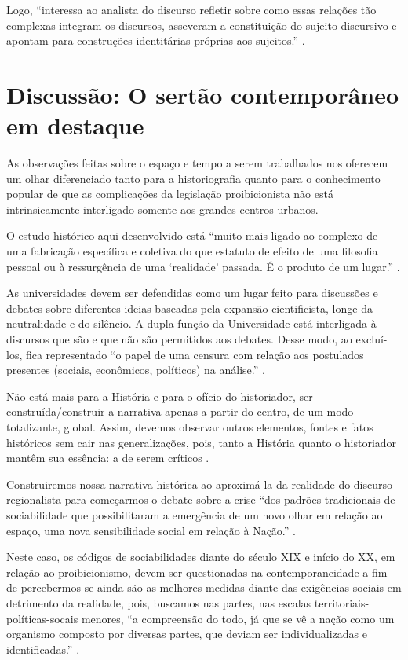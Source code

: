 \begin{refsection}
    Logo, ``interessa ao analista do discurso refletir sobre como essas relações tão complexas integram os discursos, asseveram a constituição do sujeito discursivo e apontam para construções identitárias próprias aos sujeitos.'' \cite[p.~59]{Fernandes2012Discurso}.

    \section{Discussão: O sertão contemporâneo em destaque}

    As observações feitas sobre o espaço e tempo a serem trabalhados nos oferecem um olhar diferenciado tanto para a historiografia quanto para o conhecimento popular de que as complicações da legislação proibicionista não está intrinsicamente interligado somente aos grandes centros urbanos. 

    O estudo histórico aqui desenvolvido está ``muito mais ligado ao complexo de uma fabricação específica e coletiva do que estatuto de efeito de uma filosofia pessoal ou à ressurgência de uma `realidade' passada. É o produto de um lugar.'' \cite[p.~57]{Certeau1982Escrita}.

    As universidades devem ser defendidas como um lugar feito para discussões e debates sobre diferentes ideias baseadas pela expansão cientificista, longe da neutralidade e do silêncio. A dupla função da Universidade está interligada à discursos que são e que não são permitidos aos debates. Desse modo, ao excluí-los, fica representado ``o papel de uma censura com relação aos postulados presentes (sociais, econômicos, políticos) na análise.'' \cite[p.~63]{Certeau1982Escrita}.

    Não está mais para a História e para o ofício do historiador, ser construída/construir a narrativa apenas a partir do centro, de um modo totalizante, global. Assim, devemos observar outros elementos, fontes e fatos históricos sem cair nas generalizações, pois, tanto a História quanto o historiador mantêm sua essência: a de serem críticos \cite{Certeau1982Escrita}.

    Construiremos nossa narrativa histórica ao aproximá-la da realidade do discurso regionalista para começarmos o debate sobre a crise ``dos padrões tradicionais de sociabilidade que possibilitaram a emergência de um novo olhar em relação ao espaço, uma nova sensibilidade social em relação à Nação.'' \cite[p.~52]{AlbuquerqueJr2009Invencao}.

    Neste caso, os códigos de sociabilidades diante do século XIX e início do XX, em relação ao proibicionismo, devem ser questionadas na contemporaneidade a fim de percebermos se ainda são as melhores medidas diante das exigências sociais em detrimento da realidade, pois, buscamos nas partes, nas escalas territoriais-políticas-socais menores, ``a compreensão do todo, já que se vê a nação como um organismo composto por diversas partes, que deviam ser individualizadas e identificadas.'' \cite[p.~53]{AlbuquerqueJr2009Invencao}.


\end{refsection}
